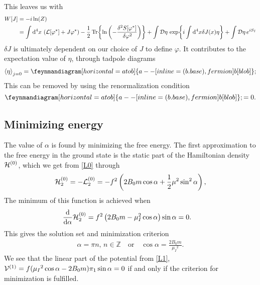 This leaves us with 
\begin{align}
    W[J] 
    & = -i \ln(Z) \\
    & = 
    \int\dd^4 x \, \left(\mathcal{L}[\varphi^*] + J \varphi^*\right)
    - \frac{1}{2} \Tr{\ln\left( - \frac{\delta^2 S[\varphi^*]}{\, \delta \varphi^2} \right)}
    + \int \mathcal{D} \eta \, \exp{i \int \dd^4 x \delta J(x) \eta  }
    + \int \mathcal{D} \eta \, e^{iS_I}
\end{align}
$\delta J$ is ultimately dependent on our choice of $J$ to define $\varphi$.
It contributes to the expectation value of $\eta$, through tadpole diagrams
\begin{align}
    \ex{\eta}_{j=0} = 
    \feynmandiagram [horizontal=a to b]{
    a --[inline=(b.base), fermion] b[blob]
    }; 
\end{align}
This can be removed by using the renormalization condition
\begin{equation}
    \feynmandiagram [horizontal=a to b]{
    a --[inline=(b.base), fermion] b[blob]
    };
    = 0.
\end{equation}


\subsection{Minimizing energy}
The value of $\alpha$ is found by minimizing the free energy. 
The first approximation to the free energy in the ground state is the static part of the Hamiltonian density $\mathcal{H}^{(0)}$, which we get from \autoref{L0} through
\begin{equation}
    \mathcal{H}_2^{(0)} = - \mathcal{L}_2^{(0)} = 
    -f^2   
    \left(
        2B_0m \cos{\alpha}
        + \frac{1}{2} \mu^2 \sin^2{\alpha}
    \right),
\end{equation}
The minimum of this function is achieved when
\begin{align*}
    &\dv{\alpha} \mathcal{H}_2^{(0)} 
    = f^2\left(2B_0m - \mu_I^2\cos{\alpha}\right)\sin{\alpha}
    = 0.
\end{align*}
This gives the solution set and minimization criterion
\begin{align}
    \alpha = \pi n, \, n \in \mathbb{Z} \quad
    \mathrm{or} \quad
    \cos{\alpha} = \frac{2B_0m}{\mu_I{}^2}.
\end{align}
We see that the linear part of the potential from \autoref{L1}, $\mathcal{V}^{(1)} = f(\mu_I{}^2\cos{\alpha} - 2B_0m)\pi_1 \sin{\alpha}= 0$ if and only if the criterion for minimization is fulfilled.

